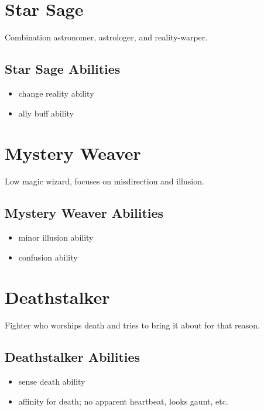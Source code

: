 \begin{multicols}{2}
\section{Star Sage}

Combination astronomer, astrologer, and reality-warper.

\subsection{Star Sage Abilities}

\begin{itemize}
    \item change reality ability
    \item ally buff ability
\end{itemize}

\section{Mystery Weaver}

Low magic wizard, focuses on misdirection and illusion.

\subsection{Mystery Weaver Abilities}

\begin{itemize}
    \item minor illusion ability
    \item confusion ability
\end{itemize}

\section{Deathstalker}

Fighter who worships death and tries to bring it about for that reason.

\subsection{Deathstalker Abilities}

\begin{itemize}
    \item sense death ability
    \item affinity for death; no apparent heartbeat, looks gaunt, etc.
\end{itemize}


\end{multicols}

